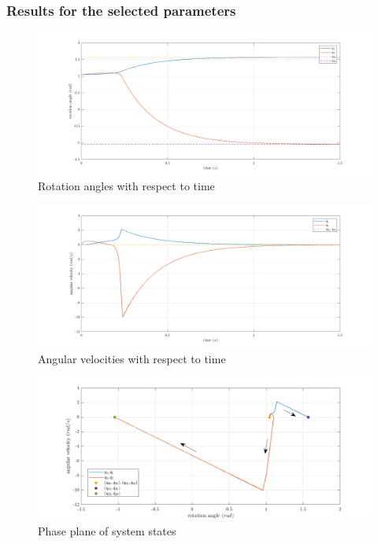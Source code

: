 \documentclass[a4paper]{article}
\begin{document}
\subsubsection{Results for the selected parameters}
\begin{figure}[H]
    \centering
    \includegraphics[width=15cm]{fig/sim1/q.png}
    \caption{Rotation angles with respect to time}
\end{figure}
\vspace*{-0.5cm}
\begin{figure}[H]
    \centering
    \includegraphics[width=15cm]{fig/sim1/qdot.png}
    \caption{Angular velocities with respect to time}
\end{figure}
\begin{figure}[H]
    \centering
    \includegraphics[width=15cm]{fig/sim1/phaseplane.png}
    \caption{Phase plane of system states}
\end{figure}
\end{document}
